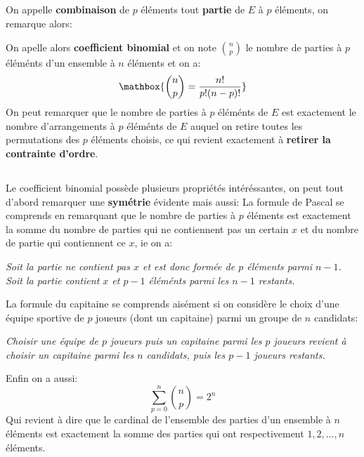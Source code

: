 \subsection*{}
On appelle \textbf{combinaison} de \(p\) éléments tout \textbf{partie} de \(E\) à \(p\) éléments, on remarque alors:
\begin{center}
\end{center}
On apelle alors \textbf{coefficient binomial} et on note \(\binom{n}{p}\) le nombre de parties à \(p\) éléménts d'un ensemble à \(n\) éléments et on a:
\[
   \mathbox{\binom{n}{p} = \frac{n!}{p!(n - p)!}}   
\]
On peut remarquer que le nombre de parties à \(p\) éléménts de \(E\) est exactement le nombre d'arrangements à \(p\) éléménts de \(E\) auquel on retire toutes les permutations des \(p\) éléments choisis, ce qui revient exactement à \textbf{retirer la contrainte d'ordre}.

\subsection*{}
Le coefficient binomial possède plusieurs propriétés intéréssantes, on peut tout d'abord remarquer une \textbf{symétrie} évidente mais aussi:
La formule de Pascal se comprends en remarquant que le nombre de parties à \(p\) éléments est exactement la somme du nombre de parties qui ne contiennent pas un certain \(x\) et du nombre de partie qui contiennent ce \(x\), ie on a:
\begin{center}
   \textit{Soit la partie ne contient pas \(x\) et est donc formée de \(p\) éléments parmi \(n - 1\).\+ Soit la partie contient \(x\) et \(p - 1\) éléménts parmi les \(n - 1\) restants.}
\end{center} 

La formule du capitaine se comprends aisément si on considère le choix d'une équipe sportive de \(p\) joueurs (dont un capitaine) parmi un groupe de \(n\) candidats:
\begin{center}
   \textit{Choisir une équipe de \(p\) joueurs puis un capitaine parmi les \(p\) joueurs\+ revient à choisir un capitaine parmi les \(n\) candidats, puis les \(p - 1\) joueurs restants.}
\end{center} 
Enfin on a aussi:
\[
   \sum_{p=0}^n \binom{n}{p} = 2^n       
\]
Qui revient à dire que le cardinal de l'ensemble des parties d'un ensemble à \(n\) éléments est exactement la somme des parties qui ont respectivement \(1, 2, \ldots, n\) éléments. 

